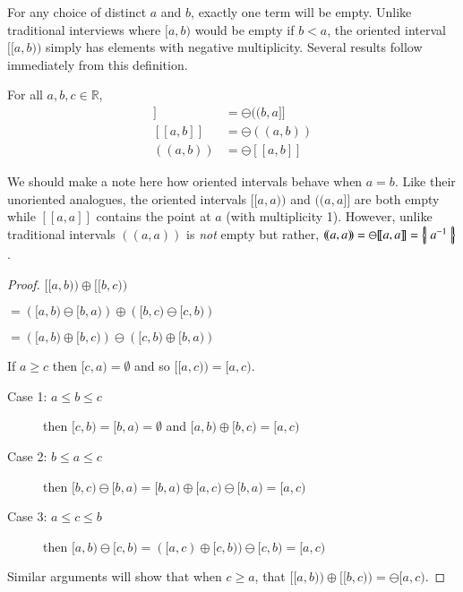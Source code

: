 For any choice of distinct $a$ and $b$, exactly one term will be empty.
Unlike traditional interviews where $[a,b)$ would be empty if $b < a$,  
the oriented interval $[\![a,b)\!)$ simply has elements with negative multiplicity.
Several results follow immediately from this definition.

\begin{theorem} For all $a,b,c \in \mathbb{R}$, 
	\begin{align}
		[\![a,b)\!) &= \ominus [\![b,a)\!) \\
		(\!(a,b]\!] &= \ominus (\!(b,a]\!] \\
		[\![a,b]\!] &= \ominus (\!(a,b)\!) \\
		(\!(a,b)\!) &= \ominus [\![a,b]\!]
	\end{align}
\end{theorem}

We should make a note here how oriented intervals behave when $a=b$.
Like their unoriented analogues, the oriented intervals $[\![ a,a )\!)$ and $(\!( a,a ]\!]$ are both empty 
while $[\![a,a]\!]$ contains the point at $a$ (with multiplicity 1).
However, unlike traditional intervals $(\!(a,a)\!)$ is \emph{not} empty but rather, $(\!(a,a)\!) = \ominus [\![a,a]\!] = \left\{ \! \left| \; a^{-1} \; \right| \! \right\}$.


\begin{theorem}
	For all $a,b,c \in \mathbb{R}$ (regardless of relative ordering),
	\begin{equation}
		[\![ a,b )\!) \oplus [\![ b,c )\!) = [\![ a,c )\!)
	\end{equation}
\end{theorem}

\begin{proof}
	$[\![a,b)\!) \oplus [\![ b,c )\!)$ 

	$= \left( [a,b) \ominus [b,a) \right) \oplus \left( [b,c) \ominus [c,b) \right)$ 

	$= \left( [a,b) \oplus [b,c) \right) \ominus \left( [c,b) \oplus [b,a) \right)$

	If $a \geq c$ then $[c,a) = \emptyset$ and so $[\![a,c)\!) = [a,c)$. 
	\begin{description}
		\item[Case 1: $a \leq b \leq c$] then $[c,b) = [b,a) = \emptyset$ and $[a,b) \oplus [b,c) = [a,c)$
		\item[Case 2: $b \leq a \leq c$] then $[b,c) \ominus [b,a) = [b,a) \oplus [a,c) \ominus [b,a) = [a,c)$
		\item[Case 3: $a \leq c \leq b$] then $[a,b) \ominus [c,b) = ([a,c) \oplus [c,b)) \ominus [c,b) = [a,c)$
	\end{description}
	Similar arguments will show that when $c \geq a$, that $[\![a,b)\!) \oplus [\![ b,c )\!) = \ominus [a,c)$.
	
\end{proof}

